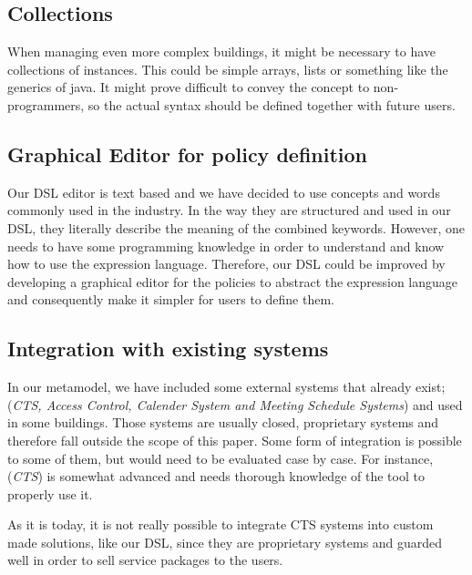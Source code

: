 \subsection{Collections}\label{subsec:collections}
When managing even more complex buildings, it might be necessary to have collections of instances. This could be simple arrays, lists or something like the generics of java. It might prove difficult to convey the concept to non-programmers, so the actual syntax should be defined together with future users.

\subsection{Graphical Editor for policy definition}\label{subsec:graphicaleditor}
Our DSL editor is text based and we have decided to use concepts and words commonly used in the industry. In the way they are structured and used in our DSL, they literally describe the meaning of the combined keywords. However, one needs to have some programming knowledge in order to understand and know how to use the expression language. Therefore, our DSL could be improved by developing a graphical editor for the policies to abstract the expression language and consequently make it simpler for users to define them.

\subsection{Integration with existing systems}\label{subsec:integration}
In our metamodel, we have included some external systems that already exist; (\textit{CTS, Access Control, Calender System and Meeting Schedule Systems}) and used in some buildings. Those systems are usually closed, proprietary systems and therefore fall outside the scope of this paper. Some form of integration is possible to some of them, but would need to be evaluated case by case. For instance, (\textit{CTS}) is somewhat advanced and needs thorough knowledge of the tool to properly use it. 

As it is today, it is not really possible to integrate CTS systems into custom made solutions, like our DSL, since they are proprietary systems and guarded well in order to sell service packages to the users.


